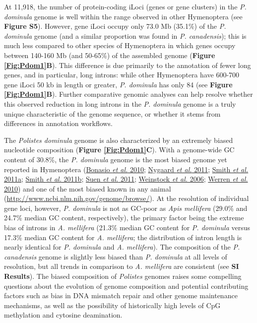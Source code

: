 At 11,918, the number of protein-coding iLoci (genes or gene clusters)
in the \textit{P. dominula} genome is well within the range observed in
other Hymenoptera (see \textbf{Figure S5}). However, gene iLoci occupy
only 73.0 Mb (35.1\%) of the \textit{P. dominula} genome (and a similar
proportion was found in \textit{P. canadensis}); this is much less
compared to other species of Hymenoptera in which genes occupy between
140-160 Mb (and 50-65\%) of the assembled genome (\textbf{Figure \ref{Fig:Pdom1}B}).
This difference is due primarily to the annotation of fewer long genes,
and in particular, long introns: while other Hymenoptera have 600-700
gene iLoci 50 kb in length or greater, \textit{P. dominula} has only 84
(see \textbf{Figure \ref{Fig:Pdom1}B}). Further comparative genomic analyses can help
resolve whether this observed reduction in long introns in the \textit{P.
dominula} genome is a truly unique characteristic of the genome
sequence, or whether it stems from differences in annotation workflows.

The \textit{Polistes dominula} genome is also characterized by an
extremely biased nucleotide composition (\textbf{Figure \ref{Fig:Pdom1}C}). With a
genome-wide GC content of 30.8\%, the \textit{P. dominula} genome is the
most biased genome yet reported in Hymenoptera
(\protect\hyperlink{ux5fENREFux5f5}{Bonasio \textit{et al.} 2010};
\protect\hyperlink{ux5fENREFux5f37}{Nygaard \textit{et al.} 2011};
\protect\hyperlink{ux5fENREFux5f54}{Smith \textit{et al.} 2011a};
\protect\hyperlink{ux5fENREFux5f55}{Smith \textit{et al.} 2011b};
\protect\hyperlink{ux5fENREFux5f57}{Suen \textit{et al.} 2011};
\protect\hyperlink{ux5fENREFux5f69}{Weinstock \textit{et al.} 2006};
\protect\hyperlink{ux5fENREFux5f70}{Werren \textit{et al.} 2010}) and one
of the most biased known in any animal
(\url{http://www.ncbi.nlm.nih.gov/genome/browse/}). At the resolution of
individual gene loci, however, \textit{P. dominula} is not as GC-poor as
\textit{Apis mellifera} (29.0\% and 24.7\% median GC content,
respectively), the primary factor being the extreme bias of introns in
\textit{A. mellifera} (21.3\% median GC content for \textit{P. dominula}
versus 17.3\% median GC content for \textit{A. mellifera}; the
distribution of intron length is nearly identical for \textit{P. dominula}
and \textit{A. mellifera}). The composition of the \textit{P. canadensis}
genome is slightly less biased than \textit{P. dominula} at all levels of
resolution, but all trends in comparison to \textit{A. mellifera} are
consistent (see \textbf{SI Results}). The biased composition of
\textit{Polistes} genomes raises some compelling questions about the
evolution of genome composition and potential contributing factors such
as bias in DNA mismatch repair and other genome maintenance mechanisms,
as well as the possibility of historically high levels of CpG
methylation and cytosine deamination.

